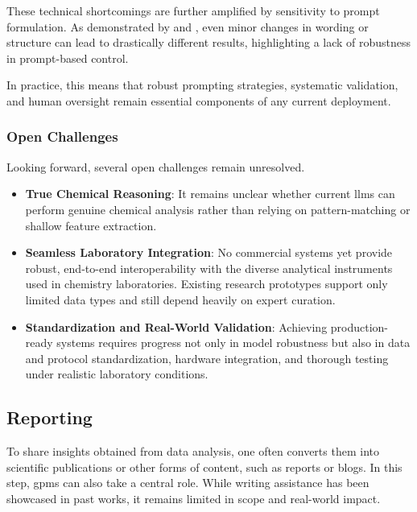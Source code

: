 These technical shortcomings are further amplified by sensitivity to prompt formulation. As demonstrated by \textcite{Yan2020auto} and \textcite{alampara2024probing}, even minor changes in wording or structure can lead to drastically different results, highlighting a lack of robustness in prompt-based control. 

In practice, this means that robust prompting strategies, systematic validation, and human oversight remain essential components of any current deployment.

\subsubsection{Open Challenges}
Looking forward, several open challenges remain unresolved.

\begin{itemize}
    \item \textbf{True Chemical Reasoning}: It remains unclear whether current \glspl{llm} can perform genuine chemical analysis rather than relying on pattern-matching or shallow feature extraction. \autocite{alampara2024probing, alampara2025task}
    \item \textbf{Seamless Laboratory Integration}: No commercial systems yet provide robust, end-to-end interoperability with the diverse analytical instruments used in chemistry laboratories. Existing research prototypes support only limited data types and still depend heavily on expert curation. \autocite{ghareeb2025robin0, mandal2024autonomous}
    \item \textbf{Standardization and Real-World Validation}: Achieving production-ready systems requires progress not only in model robustness but also in data and protocol standardization, hardware integration, and thorough testing under realistic laboratory conditions. \autocite{testini2025measuring}
\end{itemize}


\subsection{Reporting}
To share insights obtained from data analysis, one often converts them into scientific publications or other forms of content, such as reports or blogs.
In this step, \glspl{gpm} can also take a central role. While writing assistance has been showcased in past works, it remains limited in scope and real-world impact.


